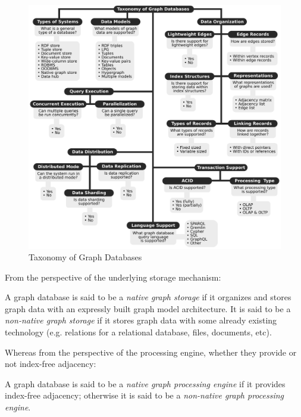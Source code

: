 \begin{figure}[H]%
	\centering%
	\includegraphics[width=1\textwidth,%
	]{images/chapter2/BestaPeterGerstenbergerFischerPodstawskiBarthelsAlonsoHoefler2019taxonomypage12.pdf}%
	\caption[Taxonomy of Graph Databases]{Taxonomy of Graph Databases}%
	\label{fig:BestaPeterGerstenbergerFischerPodstawskiBarthelsAlonsoHoefler2019taxonomypage12}%
\end{figure}%

From the perspective of the underlying storage mechanism:
\begin{definition}\label{definition:ofnativeandnonnativegraphstorages}
	A graph database is said to be a \textit{native graph storage} if it organizes and stores graph data with an expressly built graph model architecture.
	It is said to be a \textit{non-native graph storage} if it stores graph data with some already existing technology (e.g. relations for a relational database, files, documents, etc).
\end{definition}

Whereas from the perspective of the processing engine, whether they provide or not index-free adjacency:
\begin{definition}\label{definition:ofnativeandnonnativegraphprocessingengine}
	A graph database is said to be a \textit{native graph processing engine} if it provides index-free adjacency;
	otherwise it is said to be a \textit{non-native graph processing engine}.
\end{definition}

